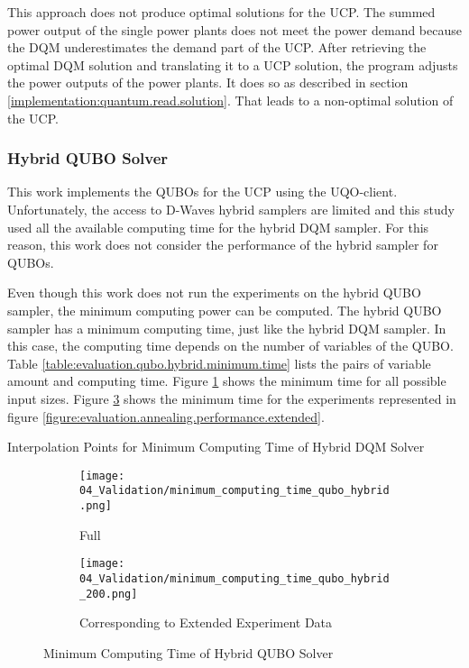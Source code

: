 This approach does not produce optimal solutions for the UCP.
The summed power output of the single power plants does not meet the power demand because the DQM underestimates the demand part of the UCP.
After retrieving the optimal DQM solution and translating it to a UCP solution, the program adjusts the power outputs of the power plants.
It does so as described in section \ref{implementation:quantum.read.solution}.
That leads to a non-optimal solution of the UCP.

\subsubsection{Hybrid QUBO Solver}

This work implements the QUBOs for the UCP using the UQO-client.
Unfortunately, the access to D-Waves hybrid samplers are limited and this study used all the available computing time for the hybrid DQM sampler.
For this reason, this work does not consider the performance of the hybrid sampler for QUBOs.

Even though this work does not run the experiments on the hybrid QUBO sampler, the minimum computing power can be computed.
The hybrid QUBO sampler has a minimum computing time, just like the hybrid DQM sampler.
In this case, the computing time depends on the number of variables of the QUBO.
Table \ref{table:evaluation.qubo.hybrid.minimum.time} lists the pairs of variable amount and computing time.
Figure \ref{figure:evaluation.qubo.hybrid.minimum.time} shows the minimum time for all possible input sizes.
Figure \ref{figure:evaluation.qubo.hybrid.minimum.time.200} shows the minimum time for the experiments represented in figure \ref{figure:evaluation.annealing.performance.extended}.

\begin{table}[ht]
  \centering
  
  \caption{Interpolation Points for Minimum Computing Time of Hybrid DQM Solver}
  \label{table:evaluation.qubo.hybrid.minimum.time}
\end{table}
\begin{figure} [ht]
  \begin{subfigure}[b]{0.5 \textwidth}
    \centering
    \texttt{[image: 04\_Validation/minimum\_computing\_time\_qubo\_hybrid.png]}
    \caption{Full}
    \label{figure:evaluation.qubo.hybrid.minimum.time}
  \end{subfigure}
  \begin{subfigure}[b]{0.5 \textwidth}
    \centering
    \texttt{[image: 04\_Validation/minimum\_computing\_time\_qubo\_hybrid\_200.png]}
    \caption{Corresponding to Extended Experiment Data}
    \label{figure:evaluation.qubo.hybrid.minimum.time.200}
  \end{subfigure}
  \caption{Minimum Computing Time of Hybrid QUBO Solver}
\end{figure}


